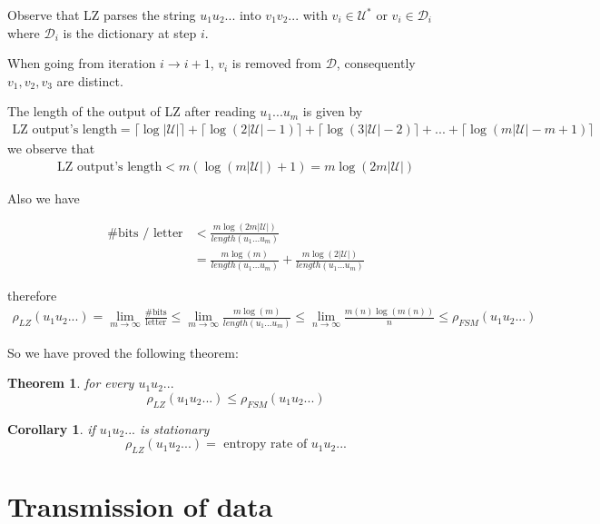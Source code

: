 \documentclass[twoside]{article}
\newtheorem{theorem}{Theorem}[section]
\newtheorem{corollary}{Corollary}[theorem]
\theoremstyle{definition} %
\def\D{\mathcal{D}}
\def\U{\mathcal{U}}
\begin{document}
Observe that LZ parses the string $u_1 u_2 ...$ into $v_1 v_2 ...$ with $v_i \in \U^*$ or $v_i \in \D_i$ where $\D_i$ is the dictionary at step $i$.

When going from iteration $i \rightarrow i+1$, $v_i$ is removed from $\D$, consequently $v_1, v_2, v_3$ are distinct.

The length of the output of LZ after reading $u_1 ... u_m$ is given by
\begin{align*}
  \text{LZ output's length} = \lceil \log |\U| \rceil + \lceil \log (2 |\U| - 1) \rceil
  + \lceil \log (3 |\U| - 2) \rceil + ...
  + \lceil \log (m|\U| - m + 1) \rceil
\end{align*}
we observe that
\begin{align*}
  \text{LZ output's length} < m(\log(m |\U|) + 1) = m \log(2 m |\U|)
\end{align*}

Also we have

\begin{align*}
  \text{\# bits / letter} &< \frac{m \log(2m |\U|)}{length(u_1 ... u_m)} \\
  &= \frac{m \log(m)}{ length(u_1 ... u_m)} + \frac{m \log(2 |\U|)}{length(u_1 ... u_m)}
\end{align*}

therefore
\begin{align*}
  \rho_{LZ}(u_1 u_2 ...) = \lim_{m \to \infty} \frac{\text{\# bits}}{\text{letter}} \leq \lim_{m \to \infty} \frac{m \log(m)}{length(u_1 ... u_m)} \leq \lim_{n \to \infty} \frac{m(n) \log(m(n))}{n} \leq \rho_{FSM}(u_1 u_2 ...)
\end{align*}

So we have proved the following theorem:

\begin{theorem}
  for every $u_1 u_2 ...$
  $$ \rho_{LZ}(u_1 u_2 ...) \leq \rho_{FSM}(u_1 u_2 ...) $$
\end{theorem}

\begin{corollary}
  if $u_1 u_2 ...$ is stationary
  $$ \rho_{LZ}(u_1 u_2 ...) = \text{ entropy rate of } u_1 u_2 ...$$
\end{corollary}




\cleardoublepage
\section{Transmission of data}
\end{document}
